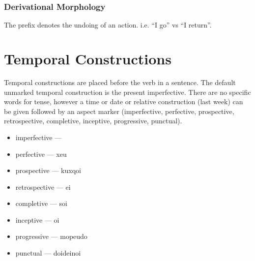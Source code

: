 \subsubsection{Derivational Morphology}

The  prefix denotes the undoing of an action. i.e.  ``I go'' vs  ``I return''.


\section{Temporal Constructions}

Temporal constructions are placed before the verb in a sentence. The default unmarked temporal construction is the present imperfective. There are no specific words for tense, however a time or date or relative construction (last week) can be given followed by an aspect marker (imperfective, perfective, prospective, retrospective, completive, inceptive, progressive, punctual).

\begin{itemize}[label={}]
    \item imperfective --- \nullset{}
    \item perfective --- xeu
    \item prospective --- kuxqoi
    \item retrospective --- \dU{}ei
    \item completive --- soi
    \item inceptive --- \tU{}oi
    \item progressive --- mo\sU{}peudo
    \item punctual --- doideinoi
\end{itemize}